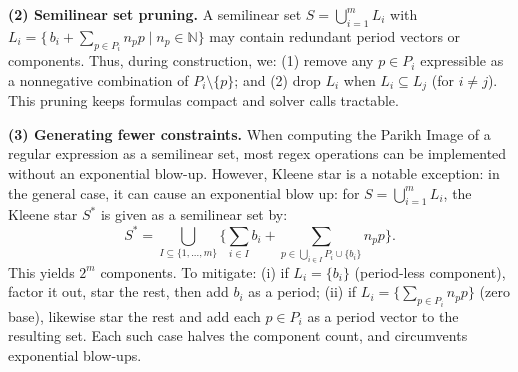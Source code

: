 
\medskip
\noindent
\textbf{(2) Semilinear set pruning.}  
A semilinear set $S=\bigcup_{i=1}^m L_i$ with 
	$L_i=\{\,b_i+\sum_{p\in P_i}n_p p \mid n_p\in\mathbb N\}$ may contain redundant 
	period vectors or components.  
	Thus, during construction, we:
	(1) remove any $p\in P_i$ expressible as a nonnegative combination of $P_i\setminus\{p\}$; 
	and (2) drop $L_i$ when $L_i\subseteq L_j$ (for \(i \neq j\)).  
	This pruning keeps formulas compact and solver calls tractable.






\medskip
\noindent
\textbf{(3) Generating fewer constraints.}  
When computing the Parikh Image of a regular expression as a semilinear set,
	most regex operations can be implemented without an exponential blow-up.
	However, Kleene star is a notable exception: in the general case, it can cause an exponential blow up: for $S=\bigcup_{i=1}^m L_i$,  the Kleene star $S^\ast$ is given as a semilinear set by: 
	\[
	S^\ast=\bigcup_{I \subseteq \{1,...,m\}} 
	\Big\{\sum_{i \in I} b_i + \sum_{p \in \bigcup_{i \in I} P_i\cup \{b_i\}} n_p p\Big\}.
	\]
	This yields $2^m$ components. To mitigate:
	(i) if $L_i=\{b_i\}$ (period-less component), factor it out, star the rest, then add $b_i$ as a period;  
	(ii) if $L_i=\{\sum_{p\in P_i}n_pp\}$ (zero base), likewise star the rest and add each $p\in P_i$ as a period vector to the resulting set.  
	Each such case halves the component count, and circumvents exponential blow-ups.




